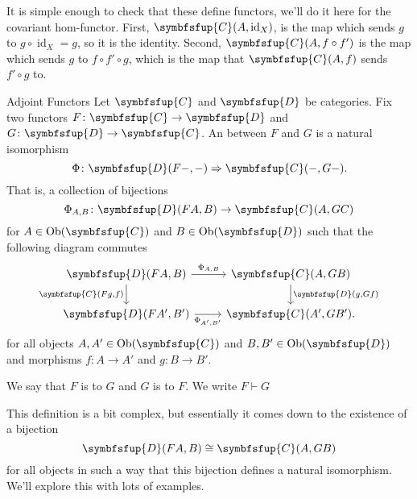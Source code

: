 \documentclass[fleqn]{NotesClass}
\newcommand{\cat}[1]{\symbfsfup{#1}}
\DeclareMathOperator{\Ob}{Ob}
\DeclareMathOperator{\id}{id}
\newcommand{\isomorphic}{\cong}
\newcommand{\naturalTransformation}{\Rightarrow}
\newcommand{\leftadjoint}{\vdash}
\begin{document}
\begin{appendices}
        It is simple enough to check that these define functors, we'll do it here for the covariant hom-functor.
        First, \(\cat{C}(A, \id_X)\), is the map which sends \(g\) to \(g \circ \id_X = g\), so it is the identity.
        Second, \(\cat{C}(A, f \circ f')\) is the map which sends \(g\) to \(f \circ f' \circ g\), which is the map that \(\cat{C}(A, f)\) sends \(f' \circ g\) to.
        
        \begin{dfn}{Adjoint Functors}{}
            Let \(\cat{C}\) and \(\cat{D}\) be categories.
            Fix two functors \(F \colon \cat{C} \to \cat{D}\) and \(G \colon \cat{D} \to \cat{C}\).
            An  between \(F\) and \(G\) is a natural isomorphism
            \begin{equation}
                \Phi \colon \cat{D}(F-, -) \naturalTransformation \cat{C}(-, G-).
            \end{equation}
            That is, a collection of bijections
            \begin{equation}
                \Phi_{A,B} \colon \cat{D}(FA, B) \to \cat{C}(A, GC)
            \end{equation}
            for \(A \in \Ob(\cat{C})\) and \(B \in \Ob(\cat{D})\) such that the following diagram commutes
            \begin{equation}
                \begin{tikzcd}
                    \cat{D}(FA, B) \arrow[r, "\Phi_{A,B}"] \arrow[d, "{\cat{C}(Fg, f)}"'] & \cat{C}(A, GB) \arrow[d, "{\cat{D}(g, Gf)}"]\\
                    \cat{D}(FA', B') \arrow[r, "\Phi_{A',B'}"'] & \cat{C}(A', GB').
                \end{tikzcd}
            \end{equation}
            for all objects \(A, A' \in \Ob(\cat{C})\) and \(B, B' \in \Ob(\cat{D})\) and morphisms \(f \colon A \to A'\) and \(g \colon B \to B'\).
            
            We say that \(F\) is  to \(G\) and \(G\) is  to \(F\).
            We write \(F \leftadjoint G\)
        \end{dfn}
    
        This definition is a bit complex, but essentially it comes down to the existence of a bijection
        \begin{equation}
            \cat{D}(FA, B) \isomorphic \cat{C}(A, GB)
        \end{equation}
        for all objects in such a way that this bijection defines a natural isomorphism.
        We'll explore this with lots of examples.
        

\end{appendices}
\end{document}
